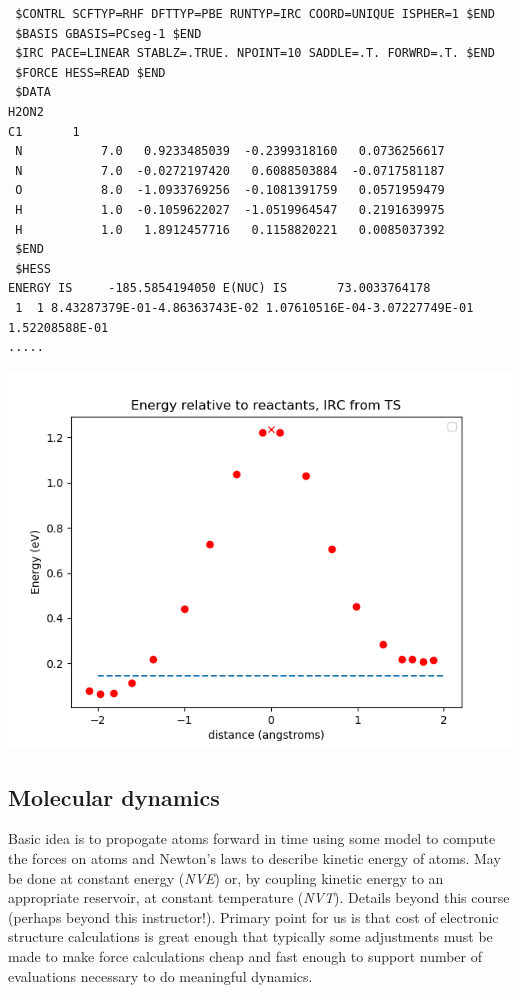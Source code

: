 \documentclass[11pt]{article}
\begin{document}
\begin{verbatim}
 $CONTRL SCFTYP=RHF DFTTYP=PBE RUNTYP=IRC COORD=UNIQUE ISPHER=1 $END
 $BASIS GBASIS=PCseg-1 $END
 $IRC PACE=LINEAR STABLZ=.TRUE. NPOINT=10 SADDLE=.T. FORWRD=.T. $END
 $FORCE HESS=READ $END
 $DATA
H2ON2                                                                           
C1       1
 N           7.0   0.9233485039  -0.2399318160   0.0736256617
 N           7.0  -0.0272197420   0.6088503884  -0.0717581187
 O           8.0  -1.0933769256  -0.1081391759   0.0571959479
 H           1.0  -0.1059622027  -1.0519964547   0.2191639975
 H           1.0   1.8912457716   0.1158820221   0.0085037392
 $END      
 $HESS
ENERGY IS     -185.5854194050 E(NUC) IS       73.0033764178
 1  1 8.43287379E-01-4.86363743E-02 1.07610516E-04-3.07227749E-01 1.52208588E-01
.....
\end{verbatim}

\begin{center}
\includegraphics[width=.9\linewidth]{./Images/IRC.png}
\end{center}

\subsection{Molecular dynamics}
\label{sec:org2360a64}
Basic idea is to propogate atoms forward in time using some model to compute the forces on atoms and Newton's laws to describe kinetic energy of atoms.  May be done at constant energy (\emph{NVE}) or, by coupling kinetic energy to an appropriate reservoir, at constant temperature (\emph{NVT}).  Details beyond this course (perhaps beyond this instructor!).  Primary point for us is that cost of electronic structure calculations is great enough that typically some adjustments must be made to make force calculations cheap and fast enough to support number of evaluations necessary to do meaningful dynamics.
\end{document}
